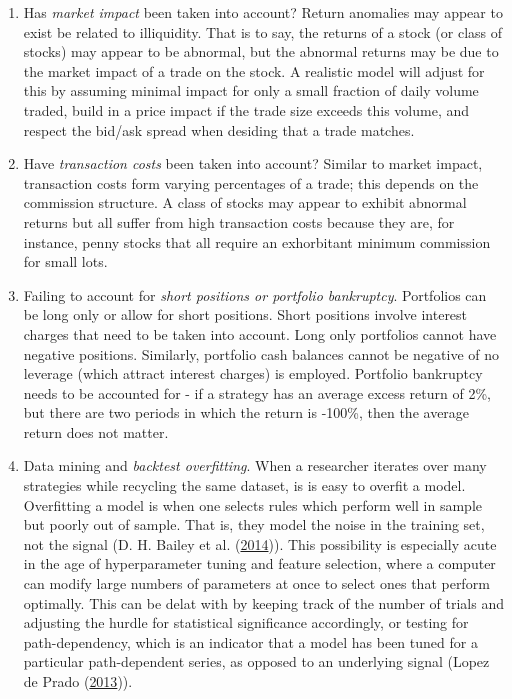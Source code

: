 \documentclass[11pt,preprint, authoryear]{elsarticle}
\numberwithin{equation}{section}
\numberwithin{figure}{section}
\numberwithin{table}{section}
\begin{document}
\begin{enumerate}
\def\labelenumi{\arabic{enumi})}
\item
  Has \emph{market impact} been taken into account? Return anomalies may
  appear to exist be related to illiquidity. That is to say, the returns
  of a stock (or class of stocks) may appear to be abnormal, but the
  abnormal returns may be due to the market impact of a trade on the
  stock. A realistic model will adjust for this by assuming minimal
  impact for only a small fraction of daily volume traded, build in a
  price impact if the trade size exceeds this volume, and respect the
  bid/ask spread when desiding that a trade matches.
\item
  Have \emph{transaction costs} been taken into account? Similar to
  market impact, transaction costs form varying percentages of a trade;
  this depends on the commission structure. A class of stocks may appear
  to exhibit abnormal returns but all suffer from high transaction costs
  because they are, for instance, penny stocks that all require an
  exhorbitant minimum commission for small lots.
\item
  Failing to account for \emph{short positions or portfolio bankruptcy}.
  Portfolios can be long only or allow for short positions. Short
  positions involve interest charges that need to be taken into account.
  Long only portfolios cannot have negative positions. Similarly,
  portfolio cash balances cannot be negative of no leverage (which
  attract interest charges) is employed. Portfolio bankruptcy needs to
  be accounted for - if a strategy has an average excess return of 2\%,
  but there are two periods in which the return is -100\%, then the
  average return does not matter.
\item
  Data mining and \emph{backtest overfitting}. When a researcher
  iterates over many strategies while recycling the same dataset, is is
  easy to overfit a model. Overfitting a model is when one selects rules
  which perform well in sample but poorly out of sample. That is, they
  model the noise in the training set, not the signal (D. H. Bailey et
  al. (\protect\hyperlink{ref-Bailey2014}{2014})). This possibility is
  especially acute in the age of hyperparameter tuning and feature
  selection, where a computer can modify large numbers of parameters at
  once to select ones that perform optimally. This can be delat with by
  keeping track of the number of trials and adjusting the hurdle for
  statistical significance accordingly, or testing for path-dependency,
  which is an indicator that a model has been tuned for a particular
  path-dependent series, as opposed to an underlying signal (Lopez de
  Prado (\protect\hyperlink{ref-LopezdePrado2013}{2013})).
\end{enumerate}
\end{document}
